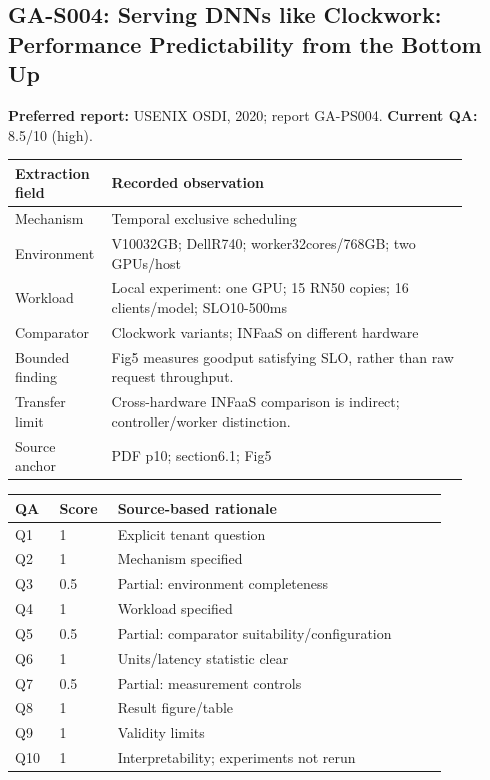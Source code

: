 \subsection{GA-S004: Serving DNNs like Clockwork: Performance Predictability from the Bottom Up}
\textbf{Preferred report:} USENIX OSDI, 2020; report GA-PS004. \textbf{Current QA:} 8.5/10 (high).
\begin{longtable}{P{0.15\linewidth}P{0.75\linewidth}}
\toprule Extraction field & Recorded observation\\\midrule\endhead
Mechanism & Temporal exclusive scheduling\\
Environment & V10032GB; DellR740; worker32cores/768GB; two GPUs/host\\
Workload & Local experiment: one GPU; 15 RN50 copies; 16 clients/model; SLO10-500ms\\
Comparator & Clockwork variants; INFaaS on different hardware\\
Bounded finding & Fig5 measures goodput satisfying SLO, rather than raw request throughput.\\
Transfer limit & Cross-hardware INFaaS comparison is indirect; controller/worker distinction.\\
Source anchor & PDF p10; section6.1; Fig5\\
\bottomrule\end{longtable}
\begin{longtable}{P{0.09\linewidth}P{0.10\linewidth}P{0.67\linewidth}}
\toprule QA & Score & Source-based rationale\\\midrule\endhead
Q1 & 1 & Explicit tenant question\\
Q2 & 1 & Mechanism specified\\
Q3 & 0.5 & Partial: environment completeness\\
Q4 & 1 & Workload specified\\
Q5 & 0.5 & Partial: comparator suitability/configuration\\
Q6 & 1 & Units/latency statistic clear\\
Q7 & 0.5 & Partial: measurement controls\\
Q8 & 1 & Result figure/table\\
Q9 & 1 & Validity limits\\
Q10 & 1 & Interpretability; experiments not rerun\\
\bottomrule\end{longtable}

